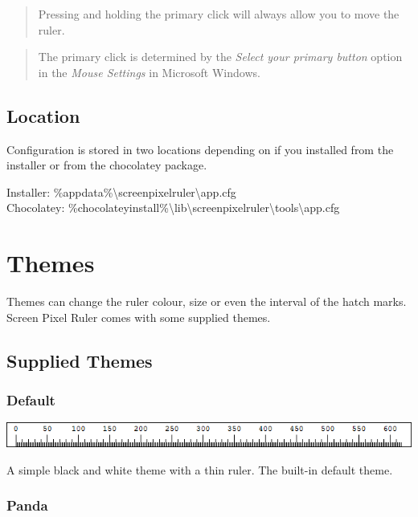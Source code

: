 \documentclass[
]{book}
\begin{document}
\begin{quote}
Pressing and holding the primary click will always allow you to move the ruler.
\end{quote}

\begin{quote}
The primary click is determined by the \emph{Select your primary button} option in the \emph{Mouse Settings} in Microsoft Windows.
\end{quote}

\hypertarget{location}{%
\section{Location}\label{location}}

Configuration is stored in two locations depending on if you installed from the installer or from the chocolatey package.

Installer: \%appdata\%\textbackslash screenpixelruler\textbackslash app.cfg\\
Chocolatey: \%chocolateyinstall\%\textbackslash lib\textbackslash screenpixelruler\textbackslash tools\textbackslash app.cfg

\hypertarget{themes}{%
\chapter{Themes}\label{themes}}

Themes can change the ruler colour, size or even the interval of the hatch marks.
Screen Pixel Ruler comes with some supplied themes.

\hypertarget{supplied-themes}{%
\section{Supplied Themes}\label{supplied-themes}}

\hypertarget{default}{%
\subsection{Default}\label{default}}

\includegraphics{images/theme-default.png}

A simple black and white theme with a thin ruler.
The built-in default theme.

\hypertarget{panda}{%
\subsection{Panda}\label{panda}}
\end{document}
